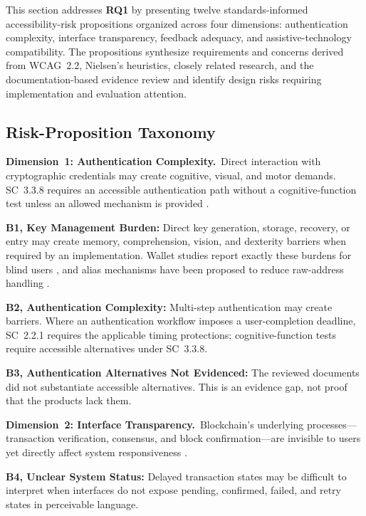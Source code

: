 \documentclass[journal]{IEEEtran}
\begin{document}
This section addresses \textbf{RQ1} by presenting twelve standards-informed accessibility-risk propositions organized across four dimensions: authentication complexity, interface transparency, feedback adequacy, and assistive-technology compatibility. The propositions synthesize requirements and concerns derived from WCAG~2.2, Nielsen's heuristics, closely related research, and the documentation-based evidence review and identify design risks requiring implementation and evaluation attention.

\subsection{Risk-Proposition Taxonomy}

\noindent\textbf{Dimension~1: Authentication Complexity.}\ Direct interaction with cryptographic credentials may create cognitive, visual, and motor demands. SC~3.3.8 requires an accessible authentication path without a cognitive-function test unless an allowed mechanism is provided \cite{wcag22}.

\textbf{B1, Key Management Burden:} Direct key generation, storage, recovery, or entry may create memory, comprehension, vision, and dexterity barriers when required by an implementation. Wallet studies report exactly these burdens for blind users \cite{zhou2023accessible}, and alias mechanisms have been proposed to reduce raw-address handling \cite{bodziony2021blockchain}.

\textbf{B2, Authentication Complexity:} Multi-step authentication may create barriers. Where an authentication workflow imposes a user-completion deadline, SC~2.2.1 requires the applicable timing protections; cognitive-function tests require accessible alternatives under SC~3.3.8.

\textbf{B3, Authentication Alternatives Not Evidenced:} The reviewed documents did not substantiate accessible alternatives. This is an evidence gap, not proof that the products lack them.

\noindent\textbf{Dimension~2: Interface Transparency.}\ Blockchain's underlying processes---transaction verification, consensus, and block confirmation---are invisible to users yet directly affect system responsiveness \cite{frohlich2022blockchain}.

\textbf{B4, Unclear System Status:} Delayed transaction states may be difficult to interpret when interfaces do not expose pending, confirmed, failed, and retry states in perceivable language.
\end{document}
